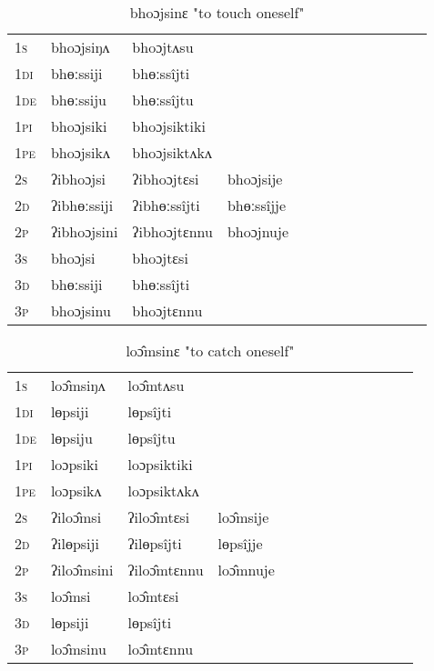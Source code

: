 \documentclass[oldfontcommands,oneside,a4paper,11pt]{article}
\begin{document}
\begin{table}[H]
\label{on.vr} \centering 
\caption{bhoɔjsinɛ  "to touch oneself"  }
\begin{tabular}{l|l|l|l|l|l|l|l|l|l|l|l|l}  \toprule
\textsc{1s} &bhoɔjsiŋʌ &bhoɔjtʌsu \\ 
\textsc{1di} &bhɵːssiji &bhɵːssîjti   \\
\textsc{1de} &bhɵːssiju &bhɵːssîjtu   \\ 
\textsc{1pi} &bhoɔjsiki &bhoɔjsiktiki   \\ 
\textsc{1pe} &bhoɔjsikʌ &bhoɔjsiktʌkʌ   \\ 
\textsc{2s} & ʔibhoɔjsi & ʔibhoɔjtɛsi &bhoɔjsije  \\ 
\textsc{2d} & ʔibhɵːssiji & ʔibhɵːssîjti &bhɵːssîjje    \\
\textsc{2p} & ʔibhoɔjsini  & ʔibhoɔjtɛnnu &bhoɔjnuje  \\ 
\textsc{3s} & bhoɔjsi & bhoɔjtɛsi   \\ 
\textsc{3d} & bhɵːssiji & bhɵːssîjti   \\ 
\textsc{3p} & bhoɔjsinu  & bhoɔjtɛnnu \\ 
\bottomrule
\end{tabular}
\end{table}


\begin{table}[H]
\label{op.vr} \centering 
\caption{loɔ̂msinɛ  "to catch oneself"  }
\begin{tabular}{l|l|l|l|l|l|l|l|l|l|l|l|l}  \toprule
\textsc{1s} &loɔ̂msiŋʌ &loɔ̂mtʌsu \\ 
\textsc{1di} &lɵpsiji &lɵpsîjti   \\
\textsc{1de} &lɵpsiju &lɵpsîjtu   \\ 
\textsc{1pi} &loɔpsiki &loɔpsiktiki   \\ 
\textsc{1pe} &loɔpsikʌ &loɔpsiktʌkʌ   \\ 
\textsc{2s} & ʔiloɔ̂msi & ʔiloɔ̂mtɛsi &loɔ̂msije  \\ 
\textsc{2d} & ʔilɵpsiji & ʔilɵpsîjti &lɵpsîjje    \\
\textsc{2p} & ʔiloɔ̂msini  & ʔiloɔ̂mtɛnnu &loɔ̂mnuje  \\ 
\textsc{3s} & loɔ̂msi & loɔ̂mtɛsi   \\ 
\textsc{3d} & lɵpsiji & lɵpsîjti   \\ 
\textsc{3p} & loɔ̂msinu  & loɔ̂mtɛnnu \\ 
\bottomrule
\end{tabular}
\end{table}
\end{document}
